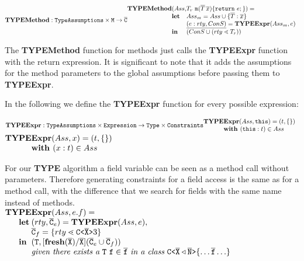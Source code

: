 \documentclass[a4paper,USenglish,cleveref, autoref, thm-restate]{lipics-v2021}
\begin{document}
\noindent
$\textbf{TYPEMethod}:\texttt{TypeAssumptions} \times
\texttt{M} \rightarrow \ol{C}\\
\begin{array}{@{}l@{}l@{}l}
\typeMethod & (Ass, & T_r \ \mathtt{m}(\overline{T} \, \overline{x})\{ \mathtt{ return }\ e; \}) =\\
& \textbf{let}
& Ass_m = Ass \cup \{ \overline{T} : \overline{x} \}\\
& & \underline{(e:rty, ConS)} = \textbf{TYPEExpr}(Ass_m, e)\\
& \mathbf{in}
& (ConS \cup (rty \lessdot T_r))\\
\end{array}
$

The \textbf{TYPEMethod} function for methods just calls the \textbf{TYPEExpr} function with the
return expression. It is significant to note that it adds the assumptions for the method parameters to the global assumptions before passing them to \textbf{TYPEExpr}.

\smallskip

In the following we define the \textbf{TYPEExpr} function for every possible expression:

\smallskip

$\textbf{TYPEExpr}:\texttt{TypeAssumptions} \times
\texttt{Expression} \rightarrow \texttt{Type} \times \texttt{Constraints}\\
\begin{array}{@{}l@{}l}
\textbf{TY} \textbf{PE} & \textbf{Expr} (Ass, \mathtt{this}) = (t , \{\})\\
& \textbf{with } (\mathtt{this} : t) \in Ass 
\end{array}
$
\smallskip
$\begin{array}{@{}l@{}l}
\textbf{TY} \textbf{PE} & \textbf{Expr} (Ass,x) = (t , \{\})\\
& \textbf{with } (x : t) \in Ass 
\end{array}
$

\smallskip

For our \textbf{TYPE} algorithm a field variable can be seen as a method call without parameters.
Therefore generating constraints for a field access is the same as for a method call,
with the difference that we search for fields with the same name instead of methods.\\
$\begin{array}{@{}l@{}l@{}l}
\textbf{TY}& \textbf{PE} & \textbf{Expr} (Ass, e.f) = \\
& \textbf{let} %
& (rty, \consSet_e) = \textbf{TYPEExpr}(Ass, e),\\
& & \consSet_f = \set{rty \lessdot \exptype{C}{\ol{X}}3}\\
& \mathbf{in}%
& (\mathtt{T}, [\textbf{fresh}(\ol{X})/\ol{X}](\consSet_e \cup \consSet_f))\\
& & \textit{given there exists a}\ \mathtt{T\ f \in \ol{f}}\ \textit{in a class}\ \exptype{C}{\ol{X} \triangleleft \ol{N}}\set{ \ldots \ol{f} \ldots }\\ 
\end{array}
$
\end{document}
